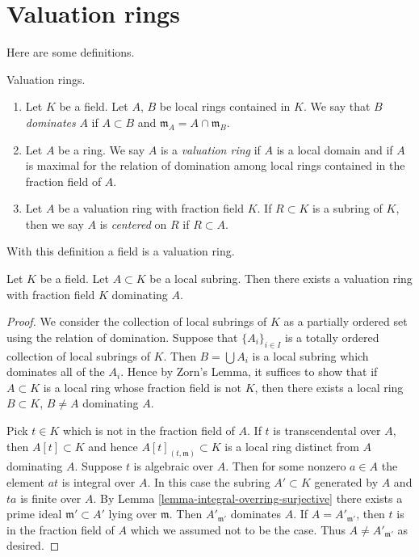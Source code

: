 \section{Valuation rings}
\label{section-valuation-rings}

\noindent
Here are some definitions.

\begin{definition}
\label{definition-valuation-ring}
Valuation rings.
\begin{enumerate}
\item Let $K$ be a field. Let $A$, $B$ be local rings contained
in $K$. We say that $B$ {\it dominates} $A$ if $A \subset B$
and $\mathfrak m_A = A \cap \mathfrak m_B$.
\item Let $A$ be a ring. We say $A$ is a {\it valuation ring}
if $A$ is a local domain and if $A$ is maximal
for the relation of domination among local rings contained in
the fraction field of $A$.
\item Let $A$ be a valuation ring with fraction field $K$.
If $R \subset K$ is a subring of $K$, then we say $A$
is {\it centered} on $R$ if $R \subset A$.
\end{enumerate}
\end{definition}

\noindent
With this definition a field is a valuation ring.

\begin{lemma}
\label{lemma-dominate}
Let $K$ be a field. Let $A \subset K$ be a local subring.
Then there exists a valuation ring with fraction field $K$
dominating $A$.
\end{lemma}

\begin{proof}
We consider the collection of local subrings
of $K$ as a partially ordered set using the relation of domination.
Suppose that $\{A_i\}_{i \in I}$ is a totally ordered
collection of local subrings of $K$. Then $B = \bigcup A_i$
is a local subring which dominates all of the $A_i$.
Hence by Zorn's Lemma, it suffices to show that if $A \subset K$
is a local ring whose fraction field is not $K$, then there
exists a local ring $B \subset K$, $B \not = A$ dominating $A$.

\medskip\noindent
Pick $t \in K$ which is not in the fraction field of $A$.
If $t$ is transcendental over $A$, then $A[t] \subset K$
and hence $A[t]_{(t, \mathfrak m)} \subset K$ is a local ring
distinct from $A$ dominating $A$. Suppose $t$ is algebraic over $A$.
Then for some nonzero $a \in A$ the element $at$ is integral over $A$.
In this case the subring $A' \subset K$ generated by $A$ and
$ta$ is finite over $A$.
By Lemma \ref{lemma-integral-overring-surjective} there exists
a prime ideal $\mathfrak m' \subset A'$ lying over
$\mathfrak m$. Then $A'_{\mathfrak m'}$ dominates
$A$. If $A = A'_{\mathfrak m'}$, then $t$
is in the fraction field of $A$ which we assumed not to be the case.
Thus $A \not = A'_{\mathfrak m'}$ as desired.
\end{proof}

